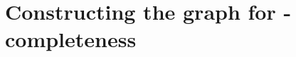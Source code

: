 \documentclass[../thesis-main/thesis-main]{subfiles}
\begin{document}
\begin{comment}
\begin{proof}
First change basis to 
\begin{equation}
\{|0\rangle,|1\rangle,|\alpha_{0}\rangle,|\alpha_{1}\rangle,\ldots,|\alpha_{n-2}\rangle\}
\end{equation}
where $|\alpha_{k}\rangle=\left(\sqrt{n-1}\right)^{-1}\sum_{j=2}^{n}e^{\frac{2\pi ijk}{n-1}}|j\rangle$.
In this basis $h$ is given by
\begin{equation}
\begin{pmatrix}
na^{2} & ab & ac\sqrt{n-1} & 0 & \ldots & 0\\
ab & b^{2} & 0 & 0 & \ldots & 0\\
ac\sqrt{n-1} & 0 & c^{2} & 0 & \ldots & 0\\
0 & 0 & 0 & c^{2} & \ldots & 0\\
\vdots & \vdots & \vdots & \vdots & \ddots & \vdots\\
0 & 0 & 0 & 0 & \ldots & c^{2}
\end{pmatrix}
\end{equation}
 and its eigenvalues are $c^{2}$ (with multiplicity $n-1$) along
with the eigenvalues of the top left $3\times3$ submatrix, which
are 
\begin{equation}
\left\{ 0,\frac{1}{2}\left(b^{2}+c^{2}+a^{2}n\pm\sqrt{\left(c^{2}-b^{2}+a^{2}n\right)^{2}+4a^{2}b^{2}-4a^{2}c^{2}}\right)\right\} .
\end{equation}
 One can easily confirm that the zero eigenvector is $|\phi\rangle$
as given in the statement of the Lemma. Using the inequality $\sqrt{\left(c^{2}-b^{2}+a^{2}n\right)^{2}+4a^{2}b^{2}-4a^{2}c^{2}}\leq\left(c^{2}-b^{2}+a^{2}n\right)+2ab$
gives 
\begin{equation}
\frac{1}{2}\left(b^{2}+c^{2}+a^{2}n-\sqrt{\left(c^{2}-b^{2}+a^{2}n\right)^{2}+4a^{2}b^{2}-4a^{2}c^{2}}\right)\geq\frac{1}{2}\left(2b^{2}-2ab\right)=b^{2}-ab.
\end{equation}
From this (and the fact that $c^{2}\geq b^{2}-ab\geq0$) we see that $h\geq0$ and we get the bound $\gamma(h)\geq b^{2}-ab$, which completes the proof.
\end{proof}
\end{comment}



\section{Constructing the graph for \QMA-completeness}\label{sec:graph_construction}
\end{document}
